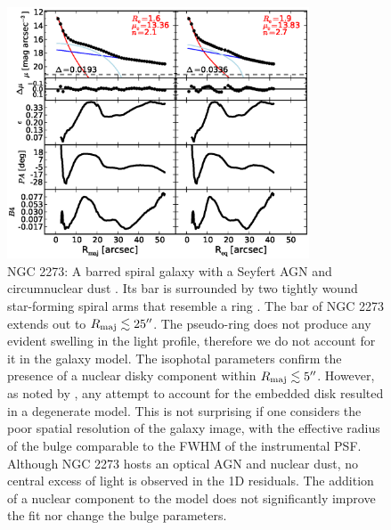 \documentclass[preprint2]{emulateapj}
\newcommand{\fitfigurewidth}{0.8\textwidth}
\begin{document}
  \begin{figure}[h]
  \begin{center}
  \includegraphics[width=\fitfigurewidth]{n2273_1Dfit.eps}
  \caption{NGC 2273: 
  A barred spiral galaxy with a Seyfert AGN \citep{contini1998} 
  and circumnuclear dust \citep{simoeslopes2007}. 
  Its bar is surrounded by two tightly wound star-forming spiral arms that resemble a ring \citep{comeron2010}. 
  The bar of NGC 2273 extends out to $R_{\rm maj} \lesssim 25''$. 
  The pseudo-ring does not produce any evident swelling in the light profile, 
  therefore we do not account for it in the galaxy model.
  The isophotal parameters confirm the presence of a nuclear disky component within $R_{\rm maj} \lesssim 5''$.
  However, as noted by \cite{laurikainen2005}, any attempt to account for the embedded disk resulted in a degenerate model. 
  This is not surprising if one considers the poor spatial resolution of the galaxy image, 
  with the effective radius of the bulge comparable to the FWHM of the instrumental PSF.
  Although NGC 2273 hosts an optical AGN and nuclear dust, no central excess of light is observed in the 1D residuals.
  The addition of a nuclear component to the model does not significantly improve the fit nor change the bulge parameters. 
  }
  \end{center}
  \end{figure}
\end{document}
